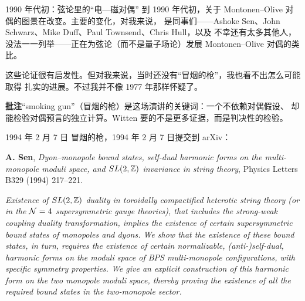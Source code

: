 
\begin{frame}{1990 年代初：弦论里的“电—磁对偶”}
   到 1990 年代初，关于 Montonen--Olive 对偶的图景在改变。主要的变化，对我来说，
  是同事们——Ashoke Sen、John Schwarz、Mike Duff、Paul Townsend、Chris Hull，以及
  不幸还有太多其他人，没法一一列举——正在为弦论（而不是量子场论）发展 Montonen--Olive
  对偶的类比。
  \vspace{0.4em}

  这些论证很有启发性。但对我来说，当时还没有“冒烟的枪”，我也看不出怎么可能取得
  扎实的进展。不过我并不像 1977 年那样怀疑了。
  \begin{beizhu}
  \textbf{批注}\quad “smoking gun”（冒烟的枪）是这场演讲的关键词：一个不依赖对偶假设、
  却能检验对偶预言的独立计算。Witten 要的不是更多证据，而是判决性的检验。
  \end{beizhu}
\end{frame}

\begin{frame}{1994 年 2 月 7 日}
   冒烟的枪，1994 年 2 月 7 日提交到 arXiv：
  \vspace{0.2em}

  \begin{tcolorbox}[enhanced,colback=black!3,colframe=black!3,boxrule=0pt,left=7pt,right=7pt,top=5pt,bottom=5pt,fontupper=\small]
  \textbf{A. Sen}, \emph{Dyon--monopole bound states, self-dual harmonic forms on the
  multi-monopole moduli space, and $SL(2,\mathbb{Z})$ invariance in string theory},
  Physics Letters B329 (1994) 217--221.
  \vspace{0.4em}

  \emph{Existence of $SL(2,\mathbb{Z})$ duality in toroidally compactified heterotic string
  theory (or in the $\mathcal{N}=4$ supersymmetric gauge theories), that includes the strong-weak
  coupling duality transformation, implies the existence of certain supersymmetric bound
  states of monopoles and dyons. We show that the existence of these bound states, in turn,
  requires the existence of certain normalizable, (anti-)self-dual, harmonic forms on the
  moduli space of BPS multi-monopole configurations, with specific symmetry properties.
  We give an explicit construction of this harmonic form on the two monopole moduli space,
  thereby proving the existence of all the required bound states in the two-monopole sector.}
  \end{tcolorbox}
\end{frame}

